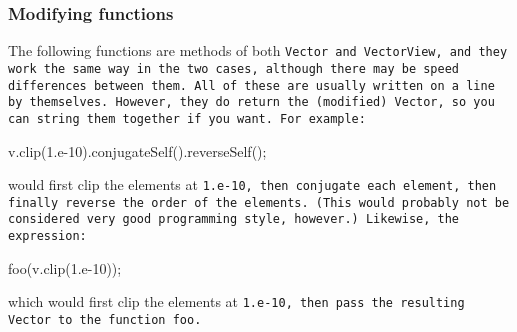 \subsubsection{Modifying functions}

The following functions are methods of both \tt{Vector} and \tt{VectorView},
and they work the same way in the two cases, although there may be speed differences
between them.  
All of these are usually written on a line by themselves.  However, they do
return the (modified) \tt{Vector}, so you can string them together if you want.
For example:
\begin{tmvcode}
v.clip(1.e-10).conjugateSelf().reverseSelf();
\end{tmvcode}
would first clip the elements at \tt{1.e-10}, then conjugate each element, then finally reverse the
order of the elements.  (This would probably not be considered 
very good programming style, however.)
Likewise, the expression:
\begin{tmvcode}
foo(v.clip(1.e-10));
\end{tmvcode}
which would first clip the elements at \tt{1.e-10},
then pass the resulting \tt{Vector} to the function \tt{foo}.  

